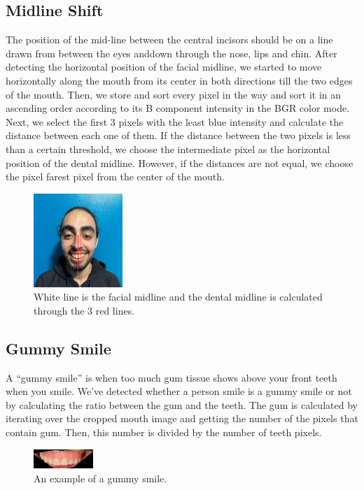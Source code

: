 \documentclass[conference,twocolumn]{IEEEtran}
\begin{document}
\subsection{Midline Shift}
The position of the mid-line between the central incisors should be on a line drawn from between the eyes anddown through the nose, lips and chin.
After detecting the horizontal position of the facial midline, we started to move horizontally along the mouth from its center in both directions till the two edges of the mouth.
Then, we store and sort every pixel in the way and sort it in an ascending order according to its B component intensity in the BGR color mode.
Next, we select the first 3 pixels with the least blue intensity and calculate the distance between each one of them.
If the distance between the two pixels is less than a certain threshold, we choose the intermediate pixel as the horizontal position of the dental midline.
However, if the distances are not equal, we choose the pixel farest pixel from the center of the mouth. 
\begin{figure}[H]
    \centering
    \includegraphics[width=0.3\textwidth]{midline_shift.png}
    \caption{White line is the facial midline and the dental midline is calculated through the 3 red lines.}
    \label{fig:my_label}
\end{figure}
\subsection{Gummy Smile}
A “gummy smile” is when too much gum tissue shows above your front teeth when you smile.
We've detected whether a person smile is a gummy smile or not by calculating the ratio between the gum and the teeth.
The gum is calculated by iterating over the cropped mouth image and getting the number of the pixels that contain gum. Then, this number is divided by the number of teeth pixels.
\begin{figure}[H]
    \centering
    \includegraphics[width=0.2\textwidth]{gummy_smile.png}
    \caption{An example of a gummy smile.}
    \label{fig:my_label}
\end{figure}
\end{document}
